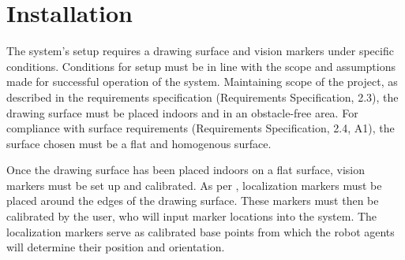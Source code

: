 
\section{Installation}
\label{sec:install}

The system's setup requires a drawing surface and vision markers under specific conditions. Conditions for setup must be in line with the scope and assumptions made for successful operation of the system. Maintaining scope of the project, as described in the requirements specification (Requirements Specification, 2.3), the drawing surface must be placed indoors and in an obstacle-free area. For compliance with surface requirements (Requirements Specification, 2.4, A1), the surface chosen must be a flat and homogenous surface.

Once the drawing surface has been placed indoors on a flat surface, vision markers must be set up and calibrated. As per , localization markers must be placed around the edges of the drawing surface. These markers must then be calibrated by the user, who will input marker locations into the system. The localization markers serve as calibrated base points from which the robot agents will determine their position and orientation.
